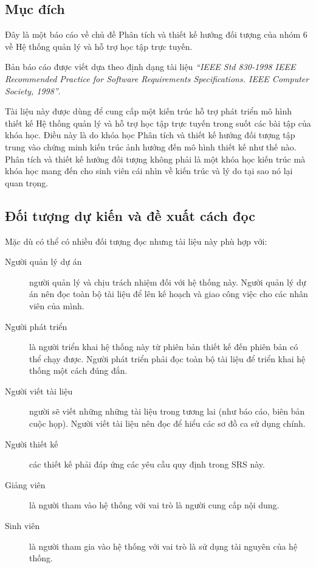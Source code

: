 \documentclass[./../main_file.tex]{subfiles}
\begin{document}
\subsection{Mục đích}

Đây là một báo cáo về chủ đề Phân tích và thiết kế hướng đối tượng của nhóm 6 về Hệ thống quản lý và hỗ trợ học tập trực tuyến. 


Bản báo cáo được viết dựa theo định dạng tài liệu \textit{“IEEE Std 830-1998 IEEE Recommended Practice for Software Requirements Specifications. IEEE Computer Society, 1998”}. 


Tài liệu này được dùng để cung cấp một kiến trúc hỗ trợ phát triển mô hình thiết kế  Hệ thống quản lý và hỗ trợ học tập trực tuyến trong suốt các bài tập của khóa học. Điều này là do khóa học Phân tích và thiết kế hướng đối tượng tập trung vào chứng minh kiến trúc ảnh hưởng đến mô hình thiết kế như thế nào. Phân tích và thiết kế hướng đối tượng không phải là một khóa học kiến trúc mà khóa học mang đến cho sinh viên cái nhìn về kiến trúc và lý do tại sao nó lại quan trọng.


\subsection{Đối tượng dự kiến và đề xuất cách đọc}

Mặc dù có thể có nhiều đối tượng đọc nhưng tài liệu này phù hợp với:

\begin{description}
	\item[Người quản lý dự án] người quản lý và chịu trách nhiệm đối với hệ thống này. Người quản lý dự án nên đọc toàn bộ tài liệu để lên kế hoạch và giao công việc cho các nhân viên của mình.
	\item[Người phát triển] là người triển khai hệ thống này từ phiên bản thiết kế đến phiên bản có thể chạy được. Người phát triển phải đọc toàn bộ tài liệu để triển khai hệ thống một cách đúng đắn.
	\item[Người viết tài liệu] người sẽ viết những những tài liệu trong tương lai (như báo cáo, biên bản cuộc họp). Người viết tài liệu nên đọc để hiểu các sơ đồ ca sử dụng chính.
	\item[Người thiết kế] các thiết kế phải đáp ứng các yêu cầu quy định trong SRS này.
	\item[Giảng viên]là người tham vào hệ thống với vai trò là người cung cấp nội dung.
	\item[Sinh viên] là người tham gia vào hệ thống với vai trò là sử dụng tài nguyên của hệ thống. 
	
\end{description}
\end{document}
